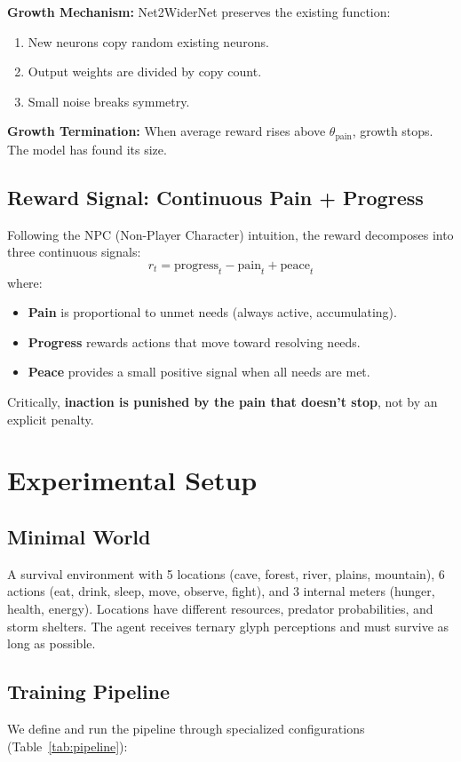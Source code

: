 \documentclass{article}
\begin{document}
\textbf{Growth Mechanism:} Net2WiderNet preserves the existing function:
\begin{enumerate}
    \item New neurons copy random existing neurons.
    \item Output weights are divided by copy count.
    \item Small noise breaks symmetry.
\end{enumerate}

\textbf{Growth Termination:} When average reward rises above $\theta_{\text{pain}}$, growth stops. The model has found its size.

\subsection{Reward Signal: Continuous Pain + Progress}
Following the NPC (Non-Player Character) intuition, the reward decomposes into three continuous signals:
\begin{equation}
r_t = \text{progress}_t - \text{pain}_t + \text{peace}_t
\end{equation}
where:
\begin{itemize}
    \item \textbf{Pain} is proportional to unmet needs (always active, accumulating).
    \item \textbf{Progress} rewards actions that move toward resolving needs.
    \item \textbf{Peace} provides a small positive signal when all needs are met.
\end{itemize}
Critically, \textbf{inaction is punished by the pain that doesn't stop}, not by an explicit penalty.

\section{Experimental Setup}

\subsection{Minimal World}
A survival environment with 5 locations (cave, forest, river, plains, mountain), 6 actions (eat, drink, sleep, move, observe, fight), and 3 internal meters (hunger, health, energy). Locations have different resources, predator probabilities, and storm shelters. The agent receives ternary glyph perceptions and must survive as long as possible.

\subsection{Training Pipeline}
\label{sec:curriculum}
We define and run the pipeline through specialized configurations (Table~\ref{tab:pipeline}):
\end{document}
